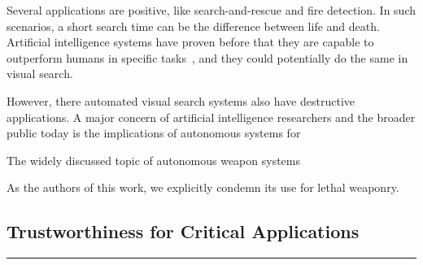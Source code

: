 Several applications are positive, like search-and-rescue and fire detection.
In such scenarios, a short search time can be the difference between life and death.
Artificial intelligence systems have proven before that they are capable to outperform humans in specific tasks~\cite{silver_alphago_2016,vinyals_alphastar_2019}, and they could potentially do the same in visual search.

However, there automated visual search systems also have destructive applications.
A major concern of artificial intelligence researchers and the broader public today is the implications of autonomous systems for 

The widely discussed topic of autonomous weapon systems


As the authors of this work, we explicitly condemn its use for lethal weaponry.

\subsection{Trustworthiness for Critical Applications}








\rule{5cm}{1pt}


